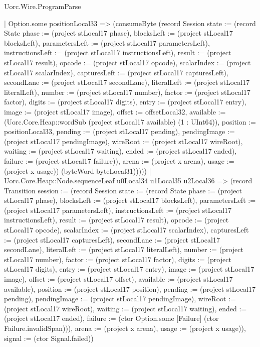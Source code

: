 \begin{lexlean}{Uorc.Wire.ProgramParse}
\begin{semanticmodule}
{                | Option.some positionLocal33 => (consumeByte (record Session {state := (record State {phase := (project stLocal17 phase), blocksLeft := (project stLocal17 blocksLeft), parametersLeft := (project stLocal17 parametersLeft), instructionsLeft := (project stLocal17 instructionsLeft), result := (project stLocal17 result), opcode := (project stLocal17 opcode), scalarIndex := (project stLocal17 scalarIndex), capturesLeft := (project stLocal17 capturesLeft), secondLane := (project stLocal17 secondLane), literalLeft := (project stLocal17 literalLeft), number := (project stLocal17 number), factor := (project stLocal17 factor), digits := (project stLocal17 digits), entry := (project stLocal17 entry), image := (project stLocal17 image), offset := offsetLocal32, available := (Uorc.Core.Heap::wordSub (project stLocal17 available) (1 : UInt64)), position := positionLocal33, pending := (project stLocal17 pending), pendingImage := (project stLocal17 pendingImage), wireRoot := (project stLocal17 wireRoot), waiting := (project stLocal17 waiting), ended := (project stLocal17 ended), failure := (project stLocal17 failure)}), arena := (project x arena), usage := (project x usage)}) (byteWord byteLocal31)))))
          | Uorc.Core.Heap::Node.sequenceLeaf u0Local34 u1Local35 u2Local36 => (record Transition {session := (record Session {state := (record State {phase := (project stLocal17 phase), blocksLeft := (project stLocal17 blocksLeft), parametersLeft := (project stLocal17 parametersLeft), instructionsLeft := (project stLocal17 instructionsLeft), result := (project stLocal17 result), opcode := (project stLocal17 opcode), scalarIndex := (project stLocal17 scalarIndex), capturesLeft := (project stLocal17 capturesLeft), secondLane := (project stLocal17 secondLane), literalLeft := (project stLocal17 literalLeft), number := (project stLocal17 number), factor := (project stLocal17 factor), digits := (project stLocal17 digits), entry := (project stLocal17 entry), image := (project stLocal17 image), offset := (project stLocal17 offset), available := (project stLocal17 available), position := (project stLocal17 position), pending := (project stLocal17 pending), pendingImage := (project stLocal17 pendingImage), wireRoot := (project stLocal17 wireRoot), waiting := (project stLocal17 waiting), ended := (project stLocal17 ended), failure := (ctor Option.some [Failure] (ctor Failure.invalidSpan))}), arena := (project x arena), usage := (project x usage)}), signal := (ctor Signal.failed)})
}
\end{semanticmodule}
\end{lexlean}
